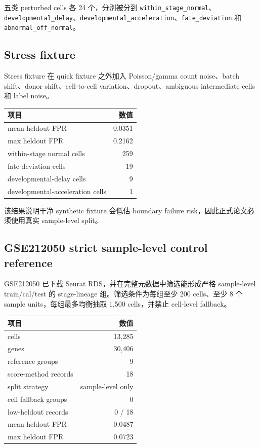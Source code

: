 \documentclass[11pt]{article}
\begin{document}
五类 perturbed cells 各 24 个，分别被分到 \texttt{within\_stage\_normal}、\texttt{developmental\_delay}、\texttt{developmental\_acceleration}、\texttt{fate\_deviation} 和 \texttt{abnormal\_off\_normal}。

\subsection*{Stress fixture}

Stress fixture 在 quick fixture 之外加入 Poisson/gamma count noise、batch shift、donor shift、cell-to-cell variation、dropout、ambiguous intermediate cells 和 label noise。

\begin{center}
\begin{tabular}{lr}
\toprule
项目 & 数值 \\
\midrule
mean heldout FPR & 0.0351 \\
max heldout FPR & 0.2162 \\
within-stage normal cells & 259 \\
fate-deviation cells & 19 \\
developmental-delay cells & 9 \\
developmental-acceleration cells & 1 \\
\bottomrule
\end{tabular}
\end{center}

该结果说明干净 synthetic fixture 会低估 boundary failure risk，因此正式论文必须使用真实 sample-level split。

\subsection*{GSE212050 strict sample-level control reference}

GSE212050 已下载 Seurat RDS，并在完整元数据中筛选能形成严格 sample-level train/cal/test 的 stage-lineage 组。筛选条件为每组至少 200 cells、至少 8 个 sample units，每组最多均衡抽取 1,500 cells，并禁止 cell-level fallback。

\begin{center}
\begin{tabular}{lr}
\toprule
项目 & 数值 \\
\midrule
cells & 13,285 \\
genes & 30,406 \\
reference groups & 9 \\
score-method records & 18 \\
split strategy & sample-level only \\
cell fallback groups & 0 \\
low-heldout records & 0 / 18 \\
mean heldout FPR & 0.0487 \\
max heldout FPR & 0.0723 \\
\bottomrule
\end{tabular}
\end{center}
\end{document}
